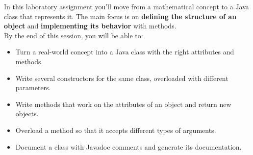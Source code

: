 In this laboratory assignment you'll move from a mathematical concept to a Java class that represents it. The main focus is on \textbf{defining the structure of an object} and \textbf{implementing its behavior} with methods. \\

By the end of this session, you will be able to:

\begin{itemize}

    \item Turn a real-world concept into a Java class with the right attributes and methods.

    \item Write several constructors for the same class, overloaded with different parameters.

    \item Write methods that work on the attributes of an object and return new objects.

    \item Overload a method so that it accepts different types of arguments.

    \item Document a class with Javadoc comments and generate its documentation.

\end{itemize}
